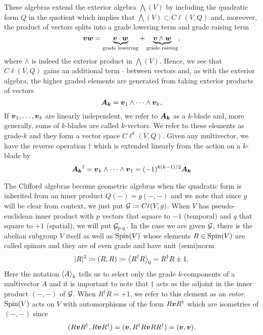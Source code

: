 \documentclass[conf]{new-aiaa}
\begin{document}
These algebras extend the exterior algebra $\bigwedge(V)$ by including the quadratic form $Q$ in the quotient which implies that $\bigwedge(V)\subset C\ell(V,Q)$ and, moreover, the product of vectors splits into a grade lowering term and grade raising term
\begin{equation}
    \blade{v}\blade{w}= \underbrace{\blade{v}\cdot \blade{w}}_{\textrm{grade lowering}} +\underbrace{\blade{v}\wedge \blade{w}}_{\textrm{grade raising}},
\end{equation}
where $\wedge$ is indeed the exterior product in $\bigwedge(V)$. Hence, we see that $C\ell(V,Q)$ gains an additional term $\cdot$ between vectors and, as with the exterior algebra, the higher graded elements are generated from taking exterior products of vectors
\begin{equation}
    \blade{A_k} = \blade{v}_1 \wedge \cdots \wedge \blade{v}_k,
\end{equation}
If $\blade{v}_1,\dots,\blade{v}_k$ are linearly independent, we refer to $\blade{A_k}$ as a $k$-blade and, more generally, sums of $k$-blades are called $k$-vectors. We refer to these elements as grade-$k$ and they form a vector space $C\ell^k(V,Q)$. Given any multivector, we have the reverse operation $\dagger$ which is extended linearly from the action on a $k$-blade by
\begin{equation}
    \blade{A_k}^\dagger = \blade{v}_k\wedge \cdots \wedge \blade{v}_1 = (-1)^{k(k-1)/2} \blade{A_k}
\end{equation}

The Clifford algebras become geometric algebras when the quadratic form is inherited from an inner product $Q(-)=g(-,-)$ and we note that since $g$ will be clear from context, we just put $\G\coloneqq C\ell(V,g)$. When $V$ has pseudo-euclidean inner product with $p$ vectors that square to $-1$ (temporal) and $q$ that square to $+1$ (spatial), we will put $\G_{p,q}$. In the case we are given $\G$, there is the abelian subgroup $V$ itself as well as $\sping(V)$ whose elements $R\in \sping(V)$ are called spinors and they are of even grade and have unit (semi)norm
\begin{equation}
|R|^2 \coloneqq (R,R) \coloneqq \proj{0}{R^\dagger R}= R^\dagger R\pm 1.
\end{equation}
Here the notation $\proj{k}{A}$ tells us to select only the grade $k$-components of a multivector $A$ and it is important to note that $\dagger$ acts as the adjoint in the inner product $(-,-)$ of $\G$. When $R^\dagger R = +1$, we refer to this element as an \emph{rotor}. $\sping(V)$ acts on $V$ with automorphisms of the form $R \blade{v} R^\dagger$ which are isometries of $(-,-)$ since
\begin{equation}
    (R\blade{v}R^\dagger,R\blade{v}R^\dagger) = (\blade{v},R^\dagger R \blade{v} RR^\dagger) = (\blade{v},\blade{v}).
\end{equation}
\end{document}

